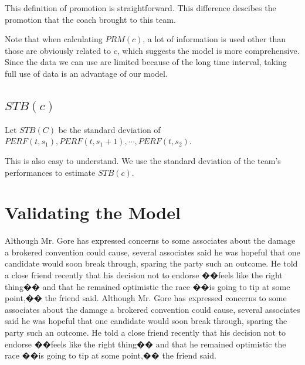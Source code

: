 
This definition of promotion is straightforward. This difference descibes the promotion that the coach brought to this team.

Note that when calculating $PRM(c)$, a lot of information is used other than those are obviously related to $c$, which suggests the model is more comprehensive. Since the data we can use are limited because of the long time interval, taking full use of data is an advantage of our model.

\subsection{$STB(c)$}
\begin{definition}
Let $STB(C)$ be the standard deviation of $PERF(t, s_1), PERF(t, s_1+1), \cdots, PERF(t, s_2)$.
\end{definition}

This is also easy to understand. We use the standard deviation of the team's performances to estimate $STB(c)$.



\section{Validating the Model}%
Although Mr. Gore has expressed concerns to some associates about
the damage a brokered convention could cause, several associates
said he was hopeful that one candidate would soon break through,
sparing the party such an outcome. He told a close friend recently
that his decision not to endorse ��feels like the right thing��
and that he remained optimistic the race ��is going to tip at some
point,�� the friend said. Although Mr. Gore has expressed concerns
to some associates about the damage a brokered convention could
cause, several associates said he was hopeful that one candidate
would soon break through, sparing the party such an outcome. He
told a close friend recently that his decision not to endorse
��feels like the right thing�� and that he remained optimistic the
race ��is going to tip at some point,�� the friend said.


